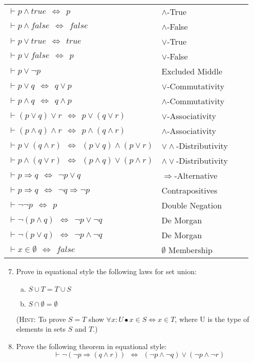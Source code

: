 \documentclass{article}
\renewcommand{\implies}{\Rightarrow}
\renewcommand{\iff}{\Leftrightarrow}
\begin{document}
\begin{enumerate}[\bf I.]
\begin{tabular}{llll}
$\vdash p \land \mathit{true} ~~\iff~~ p$   &$\land$-True\\
$\vdash p \land \mathit{false} ~~\iff~~ \mathit{false}$
&$\land$-False\\
$\vdash p \lor \mathit{true} ~~\iff~~ \mathit{true}$ &$\lor$-True\\
$\vdash p \lor \mathit{false} ~~\iff~~ p$ & $\lor$-False\\
$\vdash p \lor \neg p$  &Excluded Middle\\
$\vdash p \lor q ~~\iff~~ q \lor p$ & $\lor$-Commutativity\\
$\vdash p \land q ~~\iff~~ q \land p$ &$\land$-Commutativity\\
$\vdash (p \lor q) \lor r ~~\iff~~ p \lor (q \lor r)$ &$\lor$-Associativity\\
$\vdash (p \land q) \land r ~~\iff~~ p \land (q \land r)$
&$\land$-Associativity\\
$\vdash p \lor (q \land r) ~~\iff~~ (p \lor q) \land (p \lor r)$
&$\lor\land$-Distributivity\\
$\vdash p \land (q \lor r) ~~\iff~~ (p \land q) \lor (p \land r)$
&$\land\lor$-Distributivity\\
$\vdash p \implies q ~~\iff~~ \neg p \lor q$ &$\implies$-Alternative\\
$\vdash p \implies q ~~\iff~~ \neg q \implies \neg p$
&Contrapositives\\
$\vdash \neg\neg p ~~\iff~~ p$   &Double Negation\\
$\vdash \neg(p \land q) ~~\iff~~ \neg p \lor \neg q$&De Morgan\\
$\vdash \neg(p \lor q) ~~\iff~~ \neg p \land \neg q$& De Morgan\\
$\vdash x\in\emptyset ~~\iff~~ \mathit{false}$& $\emptyset$ Membership\\
\end{tabular}
\begin{enumerate}[1.]\setcounter{enumii}{6}
\item Prove in equational style the following laws for set union:

\begin{enumerate}[a.]
\item $S\cup T=T\cup S$
\item $S\cap\emptyset= \emptyset$
\end{enumerate}
(\textsc{Hint}: To prove $S=T$ show $\forall x: U \bullet x \in S\Leftrightarrow x\in T$, where U is the type of elements in sets $S$ and $T$.)
\item Prove the following theorem in equational style:
$$ \vdash \neg(\neg p \implies (q\land r))~~\iff~~(\neg p\land \neg q)\lor(\neg p\land\neg r)$$


\end{enumerate}
\end{enumerate}
\end{document}
